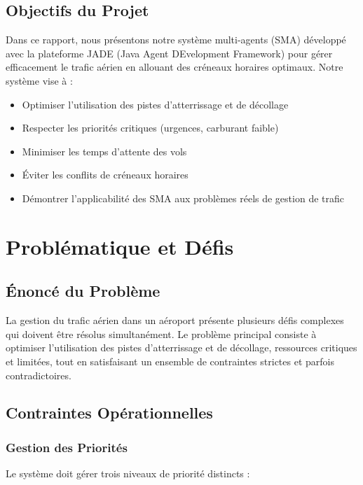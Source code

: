\documentclass[12pt,a4paper]{article}
\begin{document}
\subsection{Objectifs du Projet}

Dans ce rapport, nous présentons notre système multi-agents (SMA) développé avec la plateforme JADE (Java Agent DEvelopment Framework) pour gérer efficacement le trafic aérien en allouant des créneaux horaires optimaux. Notre système vise à :

\begin{itemize}[leftmargin=*]
    \item Optimiser l'utilisation des pistes d'atterrissage et de décollage
    \item Respecter les priorités critiques (urgences, carburant faible)
    \item Minimiser les temps d'attente des vols
    \item Éviter les conflits de créneaux horaires
    \item Démontrer l'applicabilité des SMA aux problèmes réels de gestion de trafic
\end{itemize}

\section{Problématique et Défis}

\subsection{Énoncé du Problème}

La gestion du trafic aérien dans un aéroport présente plusieurs défis complexes qui doivent être résolus simultanément. Le problème principal consiste à optimiser l'utilisation des pistes d'atterrissage et de décollage, ressources critiques et limitées, tout en satisfaisant un ensemble de contraintes strictes et parfois contradictoires.

\subsection{Contraintes Opérationnelles}

\subsubsection{Gestion des Priorités}

Le système doit gérer trois niveaux de priorité distincts :
\end{document}
